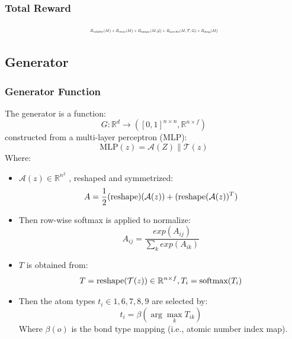 \documentclass[conference]{IEEEtran}
\begin{document}
\subsubsection{Total Reward}
\small{
    \begin{equation}
        \resizebox{0.45\textwidth}{!}{$
            R_{\textnormal{validity}}(M) + R_{\textnormal{stray}}(M) + R_{\textnormal{unique}}(M, \mathcal{G}) + R_{\textnormal{novelty}}(M, \mathcal{T}, \mathbb{G}) + R_{\textnormal{drug}}(M)
        $}
        \label{eq:total_reward}
    \end{equation}
}

\subsection{Generator}
\subsubsection{Generator Function}
\textnormal{The generator is a function:}
\begin{equation}
    G \colon \mathbb{R}^d \rightarrow ([0, 1]^{n \times n}, \mathbb{R}^{n \times f})
    \label{eq:generator}
\end{equation}
\textnormal{constructed from a multi-layer perceptron (MLP):}
\begin{equation}
    \text{MLP}(z) = \mathcal{A}(Z) \parallel \mathcal{T}(z)
    \label{eq:mlp}
\end{equation}
\textnormal{Where:}
\\
\begin{itemize}
    \item $\mathcal{A}(z) \in \mathbb{R}^{n^2}$ \textnormal{, reshaped and symmetrized:}
        \begin{equation}
            A = \frac{1}{2}(\textnormal{reshape})(\mathcal{A}(z)) + (\textnormal{reshape}(\mathcal{A}(z))^T)
            \label{eq:adjacency}
        \end{equation}
    \item \textnormal{Then row-wise softmax is applied to normalize:}
        \begin{equation}
            A_{ij} = \frac{exp(A_{ij})}{\sum_k exp(A_{ik})}
            \label{eq:softmax_1}
        \end{equation}
    \item $T$ \textnormal{is obtained from:}
        \begin{equation}
            T = \textnormal{reshape}(\mathcal{T}(z)) \in \mathbb{R}^{n \times f}, T_i = \textnormal{softmax}(T_i)
            \label{eq:T}
        \end{equation}
    \item \textnormal{Then the atom types $t_i \in {1, 6, 7, 8, 9}$ are selected by:}
        \begin{equation}
            t_i = \beta (\arg\max_k T_{ik})
            \label{eq:atom_type}
        \end{equation}
        \textnormal{Where $\beta(o)$ is the bond type mapping (i.e., atomic number index map).}
    \end{itemize}
\end{document}
